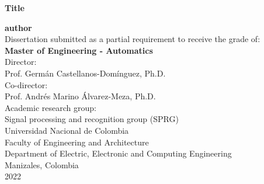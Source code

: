 \begin{center}

    \thispagestyle{empty} 
    \vspace*{2cm} 
    
    \begin{spacing}{1.9} 
        \textbf{\huge Title}\\[1.0cm]
    \end{spacing}

    \Large
        \textbf{author}\\[2.0cm]
    
    \small 
        Dissertation submitted as a partial requirement to receive the grade of:\\
        \textbf{Master of Engineering - Automatics}\\[1cm]
        
        Director:\\
        Prof. Germán Castellanos-Domínguez, Ph.D.\\[0.25cm]
        
        Co-director:\\
        Prof. Andrés Marino Álvarez-Meza, Ph.D.\\[1cm]
        
        Academic research group:\\
        Signal processing and recognition group (SPRG)\\[1cm]
        
        Universidad Nacional de Colombia\\
        Faculty of Engineering and Architecture\\ 
        Department of Electric, Electronic and Computing Engineering\\
        Manizales, Colombia\\
        2022\\

\end{center}

\newpage{\pagestyle{empty}\cleardoublepage}
\newpage

